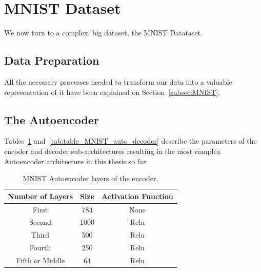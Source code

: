 \section{MNIST Dataset}

We now turn to a complex, big dataset, the MNIST Datataset. 

\subsection{Data Preparation}

All the necessary processes needed to transform our data into a valuable representation of it  have been explained on Section~\ref{subsec:MNIST}.

\subsection{The Autoencoder}

Tables~\ref{tab:table_MNIST_auto_encoder}
and~\ref{tab:table_MNIST_auto_decoder} describe the parameters of the encoder and decoder sub-architectures  resulting in the most complex Autoencoder architecture in this thesis so far. 
\begin{table}[H]
	\caption{MNIST Autoencoder layers of the encoder.}
		\label{tab:table_MNIST_auto_encoder}
	\begin{center}
		\begin{tabular}{c|c|c} %
			\textbf{Number of Layers} & \textbf{Size} & \textbf{Activation Function} \\
			\hline
			First & 784 & None\\
			Second & 1000 & Relu\\
			Third & 500  & Relu\\
			Fourth & 250 & Relu\\
			Fifth or Middle & 64 & Relu\\
		\end{tabular}
	\end{center}
\end{table}

